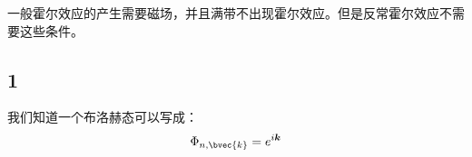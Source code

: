 \begin{issues}
\issueDraft
\end{issues}
一般霍尔效应的产生需要磁场，并且满带不出现霍尔效应。但是反常霍尔效应不需要这些条件。
\subsection{1}
我们知道一个布洛赫态可以写成：
\begin{equation}
\Phi_{n,\bvec{k}}=e^{i\boldsymbol{k}}
\end{equation}
